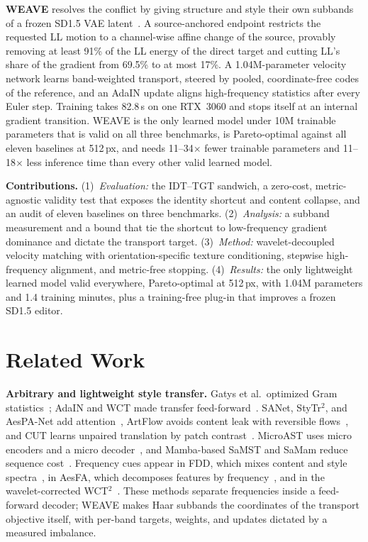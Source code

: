 \documentclass[conference]{IEEEtran}
\begin{document}
\noindent\textbf{WEAVE} resolves the conflict by giving structure and style their own subbands of a frozen
SD1.5 VAE latent~\cite{rombach2022high}. A source-anchored endpoint restricts the requested LL motion to a
channel-wise affine change of the source, provably removing at least 91\% of the LL energy of the direct
target and cutting LL's share of the gradient from 69.5\% to at most 17\%. A 1.04M-parameter velocity network learns band-weighted transport,
steered by pooled, coordinate-free codes of the reference, and an AdaIN update aligns high-frequency
statistics after every Euler step. Training takes 82.8\,s on one RTX~3060 and stops itself at an internal
gradient transition. WEAVE is the only learned model under 10M trainable parameters that is valid on all
three benchmarks, is Pareto-optimal against all eleven baselines at 512\,px, and needs 11--34$\times$ fewer
trainable parameters and 11--18$\times$ less inference time than every other valid learned model.

\noindent\textbf{Contributions.}
(1)~\emph{Evaluation:} the IDT--TGT sandwich, a zero-cost, metric-agnostic validity test that exposes the
identity shortcut and content collapse, and an audit of eleven baselines on three benchmarks.
(2)~\emph{Analysis:} a subband measurement and a bound that tie the shortcut to low-frequency gradient
dominance and dictate the transport target.
(3)~\emph{Method:} wavelet-decoupled velocity matching with orientation-specific texture conditioning,
stepwise high-frequency alignment, and metric-free stopping.
(4)~\emph{Results:} the only lightweight learned model valid everywhere, Pareto-optimal at 512\,px, with 1.04M
parameters and 1.4 training minutes, plus a training-free plug-in that improves a frozen SD1.5 editor.

\section{Related Work}
\label{sec:related}

\noindent\textbf{Arbitrary and lightweight style transfer.} Gatys et al.\ optimized Gram
statistics~\cite{gatys2015neural,gatys2016image}; AdaIN and WCT made transfer
feed-forward~\cite{huang2017arbitrary,li2017universal}. SANet, StyTr$^2$, and AesPA-Net add
attention~\cite{park2019sanet,deng2022stytr2,hong2023aespa}, ArtFlow avoids content leak with reversible
flows~\cite{an2021artflow}, and CUT learns unpaired translation by patch contrast~\cite{park2020cut}.
MicroAST uses micro encoders and a micro decoder~\cite{wang2023microast}, and Mamba-based SaMST and SaMam
reduce sequence cost~\cite{liu2024samst,liu2024samam,gu2023mamba}. Frequency cues appear in FDD, which
mixes content and style spectra~\cite{li2023fdd}, in AesFA, which decomposes features by
frequency~\cite{kwon2024aesfa}, and in the wavelet-corrected WCT$^2$~\cite{yoo2019photorealistic}. These
methods separate frequencies inside a feed-forward decoder; WEAVE makes Haar subbands the coordinates of
the transport objective itself, with per-band targets, weights, and updates dictated by a measured imbalance.
\end{document}
